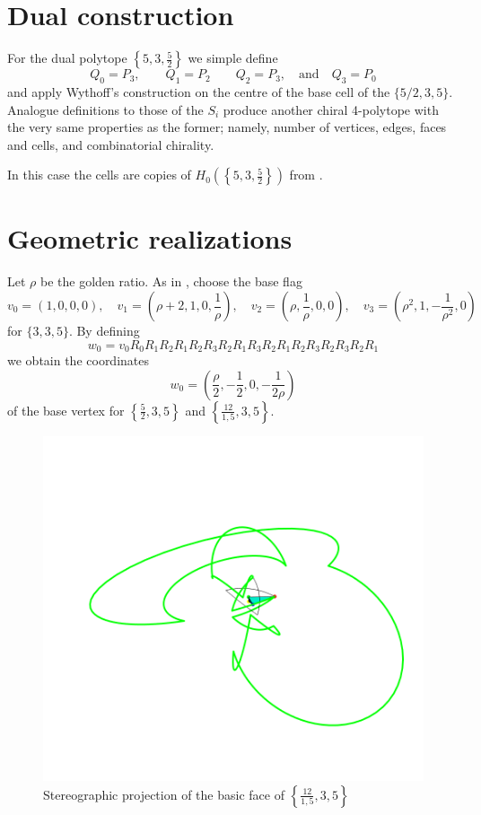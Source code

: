 \documentclass[spanish]{article}
\theoremstyle{definition}
\begin{document}
		\section{Dual construction}
	For the dual polytope $\left\{5,3,\frac{5}{2}\right\}$ we simple define
	\[Q_0=P_3,\qquad Q_1=P_2\qquad Q_2=P_3,\quad\text{and}\quad Q_3=P_0\]
	and apply Wythoff's construction on the centre of the base cell of the $\{5/2,3,5\}$. Analogue definitions to those of the $S_i$ produce another chiral 4-polytope with the very same properties as the former; namely, number of vertices, edges, faces and cells, and combinatorial chirality.
	
	In this case the cells are copies of $H_0(\left\{5,3,\frac{5}{2}\right\})$ from \cite{petcox}.
	
	\section{Geometric realizations}\label{sec:figs}
	Let $\rho$ be the golden ratio. As in \cite{petcox}, choose the base flag 
	\[v_0=(1, 0, 0, 0),\quad v_1=\left(\rho+2,1,0,\frac{1}{\rho }\right), \quad v_2=\left(\rho,\frac{1}{\rho },0,0\right),\quad v_3=\left(\rho ^2,1,-\frac{1}{\rho ^2},0\right)\]
	for $\{3,3,5\}$. By defining
	\[w_0=v_0R_0R_1R_2R_1R_2R_3R_2R_1R_3R_2R_1R_2R_3R_2R_3R_2R_1\]
	we obtain the coordinates
	\[ w_0=\left(\frac{\rho }{2}, -\frac{1}{2}, 0, -\frac{1}{2 \rho }\right)\]
	of the base vertex for $\left\{\frac{5}{2},3,5\right\}$ and $\left\{\frac{12}{1,5},3,5\right\}$.
		
	\begin{figure}
		\centering
		\includegraphics[width=\linewidth]{img2}
		\caption{Stereographic projection of the basic face of $\left\{\frac{12}{1,5},3,5\right\}$}
	\end{figure}
	
\end{document}
